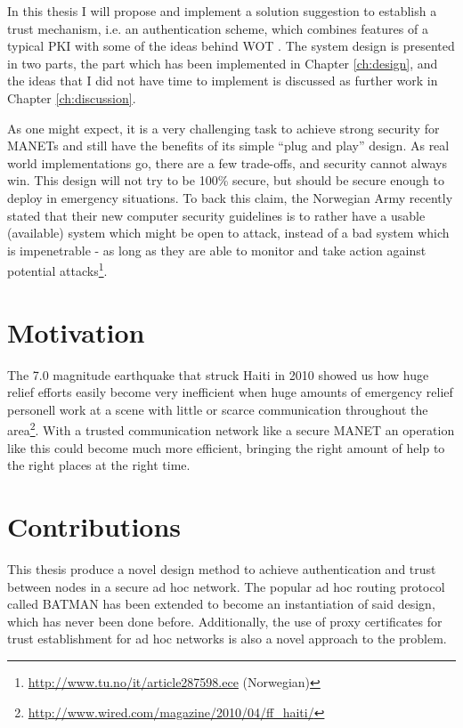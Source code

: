 In this thesis I will propose and implement a solution suggestion to establish a
trust mechanism, i.e. an authentication scheme, which combines features of a
typical \ac{PKI} with some of the ideas behind \ac{WOT}
\cite{zimmermann1995official}. The system design is presented in two parts, the
part which has been implemented in Chapter \ref{ch:design}, and the ideas that I
did not have time to implement is discussed as further work in Chapter
\ref{ch:discussion}.

As one might expect, it is a very challenging task to achieve strong security
for \acp{MANET} and still have the benefits of its simple ``plug and play''
design. As real world implementations go, there are a few trade-offs, and
security cannot always win. This design will not try to be 100\% secure, but
should be secure enough to deploy in emergency situations. To back this claim,
the Norwegian Army recently stated that their new computer security guidelines
is to rather have a usable (available) system which might be open to attack,
instead of a bad system which is impenetrable - as long as they are able to
monitor and take action against potential
attacks\footnote{\url{http://www.tu.no/it/article287598.ece} (Norwegian)}.

\section{Motivation}
The 7.0 magnitude earthquake that struck Haiti in 2010 showed us how huge
relief efforts easily become very inefficient when huge amounts of emergency
relief personell work at a scene with little or scarce communication throughout
the area\footnote{\url{http://www.wired.com/magazine/2010/04/ff_haiti/}}. With
a trusted communication network like a secure \ac{MANET} an operation like this
could become much more efficient, bringing the right amount of help to the
right places at the right time.

\section{Contributions}
This thesis produce a novel design method to achieve authentication and trust
between nodes in a secure ad hoc network. The popular ad hoc routing protocol
called BATMAN has been extended to become an instantiation of said design, which
has never been done before. Additionally, the use of proxy certificates for
trust establishment for ad hoc networks is also a novel approach to the problem.

